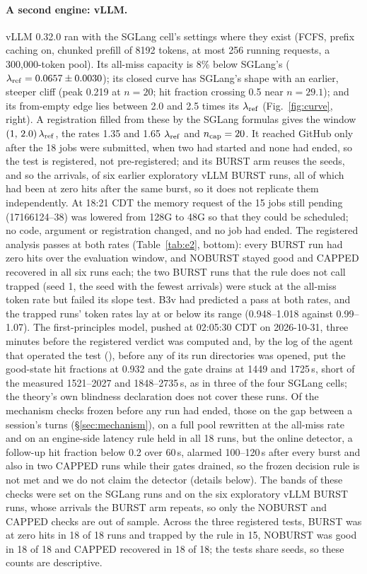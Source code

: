 \paragraph{A second engine: vLLM.}\label{sec:vllm}
vLLM 0.32.0 ran with the SGLang cell's settings where they exist (FCFS, prefix caching on, chunked prefill of 8192 tokens, at most 256 running requests, a 300,000-token pool). Its all-miss capacity is 8\% below SGLang's ($\lambda_{\mathrm{ref}}=0.0657\pm0.0030$\sps); its closed curve has SGLang's shape with an earlier, steeper cliff (peak 0.219\sps{} at $n=20$; hit fraction crossing 0.5 near $n=29.1$); and its from-empty edge lies between 2.0 and 2.5 times its $\lambda_{\mathrm{ref}}$ (Fig.~\ref{fig:curve}, right). A registration filled from these by the SGLang formulas gives the window $(1,\,2.0)\,\lambda_{\mathrm{ref}}$, the rates 1.35 and 1.65 $\lambda_{\mathrm{ref}}$ and $n_{\mathrm{cap}}=20$. It reached GitHub only after the 18 jobs were submitted, when two had started and none had ended, so the test is registered, not pre-registered; and its BURST arm reuses the seeds, and so the arrivals, of six earlier exploratory vLLM BURST runs, all of which had been at zero hits after the same burst, so it does not replicate them independently. At 18:21 CDT the memory request of the 15 jobs still pending (17166124--38) was lowered from 128G to 48G so that they could be scheduled; no code, argument or registration changed, and no job had ended. The registered analysis passes at both rates (Table~\ref{tab:e2}, bottom): every BURST run had zero hits over the evaluation window, and NOBURST stayed good and CAPPED recovered in all six runs each; the two BURST runs that the rule does not call trapped (seed 1, the seed with the fewest arrivals) were stuck at the all-miss token rate but failed its slope test. B3v had predicted a pass at both rates, and the trapped runs' token rates lay at or below its range (0.948--1.018 against 0.99--1.07). The first-principles model, pushed at 02:05:30 CDT on 2026-10-31, three minutes before the registered verdict was computed and, by the log of the agent that operated the test (), before any of its run directories was opened, put the good-state hit fractions at 0.932 and the gate drains at 1449 and 1725\,s, short of the measured 1521--2027 and 1848--2735\,s, as in three of the four SGLang cells; the theory's own blindness declaration does not cover these runs. Of the mechanism checks frozen before any run had ended, those on the gap between a session's turns (\S\ref{sec:mechanism}), on a full pool rewritten at the all-miss rate and on an engine-side latency rule held in all 18 runs, but the online detector, a follow-up hit fraction below 0.2 over 60\,s, alarmed 100--120\,s after every burst and also in two CAPPED runs while their gates drained, so the frozen decision rule is not met and we do not claim the detector (details below). The bands of these checks were set on the SGLang runs and on the six exploratory vLLM BURST runs, whose arrivals the BURST arm repeats, so only the NOBURST and CAPPED checks are out of sample. Across the three registered tests, BURST was at zero hits in 18 of 18 runs and trapped by the rule in 15, NOBURST was good in 18 of 18 and CAPPED recovered in 18 of 18; the tests share seeds, so these counts are descriptive.

